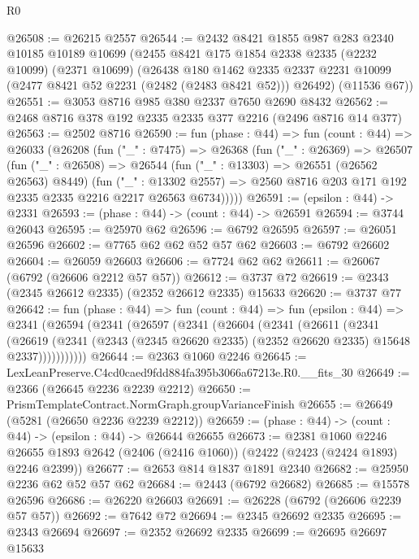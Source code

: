 \begin{lexlean}{R0}
\begin{coremodule}
@26508 := @26215 @2557
@26544 := @2432
    @8421
    @1855
    @987
    @283
    @2340
    @10185
    @10189
    @10699
    (@2455
      @8421
      @175
      @1854
      @2338
      @2335
      (@2232 @10099)
      (@2371 @10699)
      (@26438
        @180
        @1462
        @2335
        @2337
        @2231
        @10099
        (@2477 @8421 @52 @2231 (@2482 (@2483 @8421 @52)))
        @26492)
      (@11536 @67))
@26551 := @3053 @8716 @985 @380 @2337 @7650 @2690 @8432
@26562 := @2468 @8716 @378 @192 @2335 @2335 @377 @2216 (@2496 @8716 @14 @377)
@26563 := @2502 @8716
@26590 := fun (phase : @44) =>
  fun (count : @44) =>
  @26033
    (@26208
      (fun ("_" : @7475) =>
      @26368
        (fun ("_" : @26369) =>
        @26507
          (fun ("_" : @26508) =>
          @26544
            (fun ("_" : @13303) => @26551 (@26562 @26563) @8449)
            (fun ("_" : @13302 @2557) =>
            @2560 @8716 @203 @171 @192 @2335 @2335 @2216 @2217 @26563 @6734)))))
@26591 := (epsilon : @44) -> @2331
@26593 := (phase : @44) -> (count : @44) -> @26591
@26594 := @3744 @26043
@26595 := @25970 @62
@26596 := @6792 @26595
@26597 := @26051 @26596
@26602 := @7765 @62 @62 @52 @57 @62
@26603 := @6792 @26602
@26604 := @26059 @26603
@26606 := @7724 @62 @62
@26611 := @26067 (@6792 (@26606 @2212 @57 @57))
@26612 := @3737 @72
@26619 := @2343 (@2345 @26612 @2335) (@2352 @26612 @2335) @15633
@26620 := @3737 @77
@26642 := fun (phase : @44) =>
  fun (count : @44) =>
  fun (epsilon : @44) =>
  @2341
    (@26594
      (@2341
        (@26597
          (@2341
            (@26604
              (@2341
                (@26611
                  (@2341
                    (@26619
                      (@2341
                        (@2343 (@2345 @26620 @2335) (@2352 @26620 @2335) @15648 @2337)))))))))))
@26644 := @2363 @1060 @2246
@26645 := LexLeanPreserve.C4cd0caed9fdd884fa395b3066a67213e.R0.__fits_30
@26649 := @2366 (@26645 @2236 @2239 @2212)
@26650 := PrismTemplateContract.NormGraph.groupVarianceFinish
@26655 := @26649 (@5281 (@26650 @2236 @2239 @2212))
@26659 := (phase : @44) -> (count : @44) -> (epsilon : @44) -> @26644 @26655
@26673 := @2381
    @1060
    @2246
    @26655
    @1893
    @2642
    (@2406 (@2416 @1060))
    (@2422 (@2423 (@2424 @1893) @2246 @2399))
@26677 := @2653 @814 @1837 @1891 @2340
@26682 := @25950 @2236 @62 @52 @57 @62
@26684 := @2443 (@6792 @26682)
@26685 := @15578 @26596
@26686 := @26220 @26603
@26691 := @26228 (@6792 (@26606 @2239 @57 @57))
@26692 := @7642 @72
@26694 := @2345 @26692 @2335
@26695 := @2343 @26694
@26697 := @2352 @26692 @2335
@26699 := @26695 @26697 @15633

\end{coremodule}
\end{lexlean}
